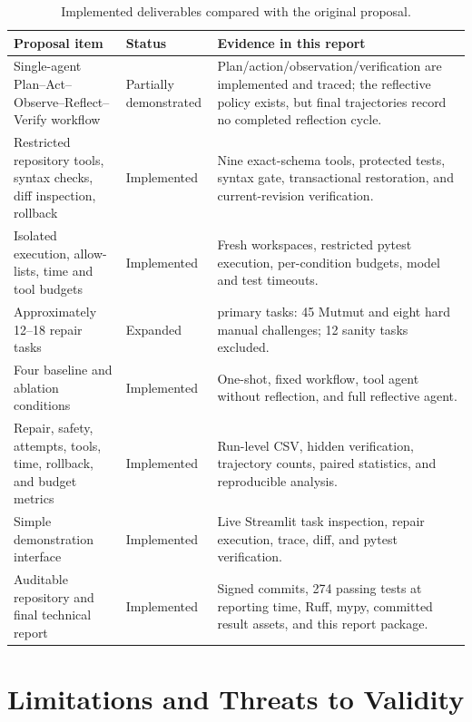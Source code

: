 \documentclass[11pt,a4paper]{article}
\begin{document}
\begin{table}[H]
\centering
\caption{Implemented deliverables compared with the original proposal.}
\small
\begin{tabularx}{\textwidth}{>{\raggedright\arraybackslash}p{}>{\raggedright\arraybackslash}p{}>{\raggedright\arraybackslash}X}
\toprule
Proposal item & Status & Evidence in this report \\
\midrule
Single-agent Plan--Act--Observe--Reflect--Verify workflow & Partially
demonstrated & Plan/action/observation/verification are implemented and traced;
the reflective policy exists, but final trajectories record no completed
reflection cycle. \\
Restricted repository tools, syntax checks, diff inspection, rollback &
Implemented & Nine exact-schema tools, protected tests, syntax gate,
transactional restoration, and current-revision verification. \\
Isolated execution, allow-lists, time and tool budgets & Implemented & Fresh
workspaces, restricted pytest execution, per-condition budgets, model and test
timeouts. \\
Approximately 12--18 repair tasks & Expanded & 53 primary tasks: 45 Mutmut and
eight hard manual challenges; 12 sanity tasks excluded. \\
Four baseline and ablation conditions & Implemented & One-shot, fixed workflow,
tool agent without reflection, and full reflective agent. \\
Repair, safety, attempts, tools, time, rollback, and budget metrics &
Implemented & Run-level CSV, hidden verification, trajectory counts, paired
statistics, and reproducible analysis. \\
Simple demonstration interface & Implemented & Live Streamlit task inspection,
repair execution, trace, diff, and pytest verification. \\
Auditable repository and final technical report & Implemented & Signed commits,
274 passing tests at reporting time, Ruff, mypy, committed result assets, and
this report package. \\
\bottomrule
\end{tabularx}
\end{table}

\section{Limitations and Threats to Validity}
\end{document}
